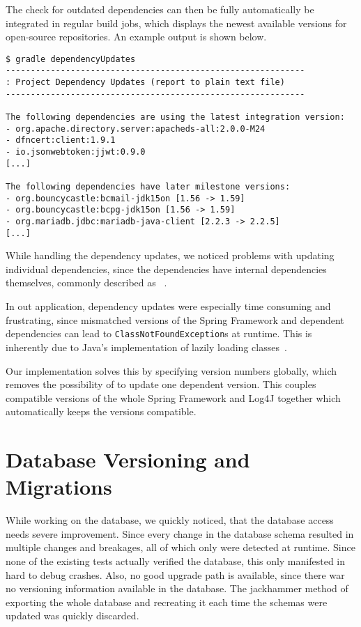 The check for outdated dependencies can then be fully automatically be integrated in regular build jobs, which displays
the newest available versions for open-source repositories.
An example output is shown below.

\begin{minipage}{\linewidth}
\begin{lstlisting}[caption={Example output of the gradle-versions-plugin}]
$ gradle dependencyUpdates
------------------------------------------------------------
: Project Dependency Updates (report to plain text file)
------------------------------------------------------------

The following dependencies are using the latest integration version:
- org.apache.directory.server:apacheds-all:2.0.0-M24
- dfncert:client:1.9.1
- io.jsonwebtoken:jjwt:0.9.0
[...]

The following dependencies have later milestone versions:
- org.bouncycastle:bcmail-jdk15on [1.56 -> 1.59]
- org.bouncycastle:bcpg-jdk15on [1.56 -> 1.59]
- org.mariadb.jdbc:mariadb-java-client [2.2.3 -> 2.2.5]
[...]
\end{lstlisting}
\end{minipage}

While handling the dependency updates, we noticed problems with updating individual dependencies, since the dependencies
have internal dependencies themselves, commonly described as ~\cite{jang2006linux}.

In out application, dependency updates were especially time consuming and frustrating, since mismatched versions of the
Spring Framework and dependent dependencies can lead to \lstinline{ClassNotFoundException}s at runtime.
This is inherently due to Java's implementation of lazily loading classes~\cite{gosling2014java}.

Our implementation solves this by specifying version numbers globally, which removes the possibility of 
to update one dependent version.
This couples compatible versions of the whole Spring Framework and Log4J together which automatically keeps the versions
compatible.

\section{Database Versioning and Migrations}\label{sec:databaseVersioningAndMigrations}
While working on the database, we quickly noticed, that the database access needs severe improvement.
Since every change in the database schema resulted in multiple changes and breakages, all of which only were detected at
runtime.
Since none of the existing tests actually verified the database, this only manifested in hard to debug crashes.
Also, no good upgrade path is available, since there war no versioning information available in the database.
The jackhammer method of exporting the whole database and recreating it each time the schemas were updated was quickly
discarded.

